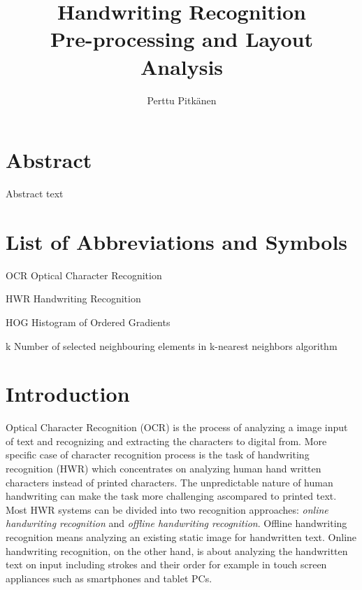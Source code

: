 \documentclass{article}
\title{%
    Handwriting Recognition \\
    \large Pre-processing and Layout Analysis}
\author{Perttu Pitk{\"a}nen}
\begin{document}
   \maketitle

   \newpage
   \section*{Abstract}
    Abstract text

   \newpage
   \tableofcontents


   \newpage
   \section*{List of Abbreviations and Symbols}

   \begin{abbrv}
    \item[OCR] Optical Character Recognition
    \item[HWR] Handwriting Recognition
    \item[HOG] Histogram of Ordered Gradients
    \item[k] Number of selected neighbouring elements in k-nearest neighbors algorithm
   \end{abbrv}

   \newpage
   \section{Introduction}
    Optical Character Recognition (OCR) is the process of analyzing a image input of  text and recognizing and extracting the characters to digital from. More specific case of character recognition process is the task of handwriting recognition (HWR) which concentrates on analyzing human hand written characters instead of printed characters. The unpredictable nature of human handwriting can make the task more challenging ascompared to printed text. Most HWR systems can be divided into two recognition approaches: \textit{online handwriting recognition} and \textit{offline handwriting recognition}. Offline handwriting recognition means analyzing an existing static image for handwritten text. Online handwriting recognition, on the other hand, is about analyzing the handwritten text on input including strokes and their order for example in touch screen appliances such as smartphones and tablet PCs.
\end{document}
